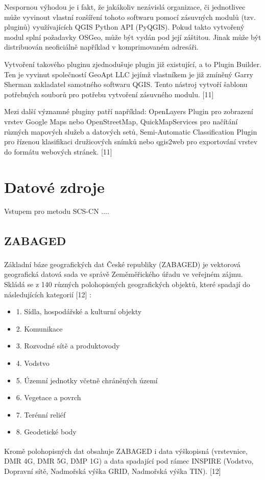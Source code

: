 \documentclass[a4paper,oneside,12pt]{book}
\begin{document}
\hspace{10mm} Nespornou výhodou je i fakt, že jakákoliv nezávislá organizace, či jednotlivec může vyvinout vlastní rozšíření tohoto softwaru pomocí zásuvných modulů (tzv. pluginů) využívajících QGIS Python API (PyQGIS). Pokud takto vytvořený modul splní požadavky OSGeo, může být vydán pod její záštitou. Jinak může být distribuován neoficiálně například v komprimovaném adresáři.

\hspace{10mm} Vytvoření takového pluginu zjednodušuje plugin již existující, a to Plugin Builder. Ten je vyvinut společností GeoApt LLC jejímž vlastníkem je již zmíněný Garry Sherman zakladatel samotného softwaru QGIS. Tento nástroj vytvoří šablonu potřebných souborů pro potřebu vytvoření zásuvného modulu. [11]

\hspace{10mm} Mezi další významné pluginy patří například: OpenLayers Plugin pro zobrazení vrstev Google Maps nebo OpenStreetMap, QuickMapServices pro načítání různých mapových služeb a datových setů, Semi-Automatic Classification Plugin pro řízenou klasifikaci družicových snímků nebo qgis2web pro exportování vrstev do formátu webových stránek. [11]



\chapter{Datové zdroje} \label{data}
\hspace{10mm} Vstupem pro metodu SCS-CN .... 

\section{ZABAGED\texorpdfstring{\textsuperscript{\textregistered}}{ (R)}} \label{zabaged}

\hspace{10mm} Základní báze geografických dat České republiky (ZABAGED\texorpdfstring{\textsuperscript{\textregistered}}{ (R)}) je vektorová geografická datová sada ve správě Zeměměřického úřadu ve veřejném zájmu. Skládá se z 140 různých polohopisných geografických objektů, které spadají do následujících kategorií [12] :
\begin{itemize}
\item 1. Sídla, hospodářské a kulturní objekty
\item 2. Komunikace
\item 3. Rozvodné sítě a produktovody
\item 4. Vodstvo 
\item 5. Územní jednotky včetně chráněných území
\item 6. Vegetace a povrch
\item 7. Terénní reliéf
\item 8. Geodetické body
\end{itemize}
\hspace{10mm} Kromě polohopisných dat obsahuje ZABAGED\texorpdfstring{\textsuperscript{\textregistered}}{ (R)} i data výškopisná (vrstevnice, DMR 4G, DMR 5G, DMP 1G) a data spadající pod rámec INSPIRE (Vodstvo, Dopravní sítě, Nadmořská výška GRID, Nadmořská výška TIN). [12] 
\end{document}
